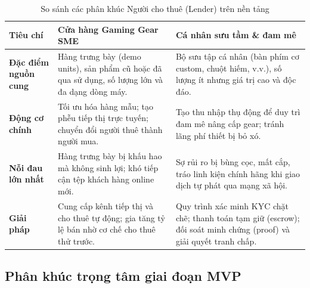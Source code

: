 \begin{table}[H]
    \centering
    \caption{So sánh các phân khúc Người cho thuê (Lender) trên nền tảng}
    \label{tab:lender-icp}
    \small
    \begin{tabular}{p{3.5cm}p{5.5cm}p{5.5cm}}
        \toprule
        \textbf{Tiêu chí} & \textbf{Cửa hàng Gaming Gear SME} & \textbf{Cá nhân sưu tầm \& đam mê} \\
        \midrule
        \textbf{Đặc điểm nguồn cung} & Hàng trưng bày (demo units), sản phẩm cũ hoặc đã qua sử dụng, số lượng lớn và đa dạng dòng máy. & Bộ sưu tập cá nhân (bàn phím cơ custom, chuột hiếm, v.v.), số lượng ít nhưng giá trị cao và độc đáo. \\
        \textbf{Động cơ chính} & Tối ưu hóa hàng mẫu; tạo phễu tiếp thị trực tuyến; chuyển đổi người thuê thành người mua. & Tạo thu nhập thụ động để duy trì đam mê nâng cấp gear; tránh lãng phí thiết bị bỏ xó. \\
        \textbf{Nỗi đau lớn nhất} & Hàng trưng bày bị khấu hao mà không sinh lợi; khó tiếp cận tệp khách hàng online mới. & Sợ rủi ro bị bùng cọc, mất cắp, tráo linh kiện chính hãng khi giao dịch tự phát qua mạng xã hội. \\
        \textbf{Giải pháp \projectname{}} & Cung cấp kênh tiếp thị và cho thuê tự động; gia tăng tỷ lệ bán nhờ cơ chế cho thuê thử trước. & Quy trình xác minh KYC chặt chẽ; thanh toán tạm giữ (escrow); đối soát minh chứng (proof) và giải quyết tranh chấp. \\
        \bottomrule
    \end{tabular}
\end{table}

\subsection{Phân khúc trọng tâm giai đoạn MVP}

